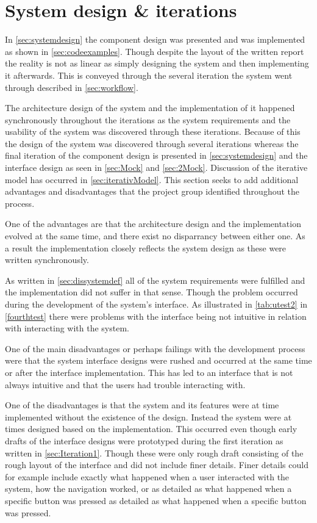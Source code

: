 \section{System design \& iterations}\label{sec:dissystemdes}

In \cref{sec:systemdesign} the component design was presented and was implemented as shown in \cref{sec:codeexamples}.
Though despite the layout of the written report the reality is not as linear as simply designing the system and then implementing it afterwards.
This is conveyed through the several iteration the system went through described in \cref{sec:workflow}.

The architecture design of the system and the implementation of it happened synchronously throughout the iterations as the system requirements and the usability of the system was discovered through these iterations.
Because of this the design of the system was discovered through several iterations whereas the final iteration of the component design is presented in \cref{sec:systemdesign} and the interface design as seen in \cref{sec:Mock} and \ref{sec:2Mock}.
Discussion of the iterative model has occurred in \cref{sec:iterativModel}.
This section seeks to add additional advantages and disadvantages that the project group identified throughout the process.

One of the advantages are that the architecture design and the implementation evolved at the same time, and there exist no disparrancy between either one.
As a result the implementation closely reflects the system design as these were written synchronously.

As written in \cref{sec:dissystemdef} all of the system requirements were fulfilled and the implementation did not suffer in that sense.
Though the problem occurred during the development of the system's interface.
As illustrated in \cref{tab:utest2} in \cref{fourthtest} there were problems with the interface being not intuitive in relation with interacting with the system. 

One of the main disadvantages or perhaps failings with the development process were that the system interface designs were rushed and occurred at the same time or after the interface implementation.
This has led to an interface that is not always intuitive and that the users had trouble interacting with.

One of the disadvantages is that the system and its features were at time implemented without the existence of the design.
Instead the system were at times designed based on the implementation.
This occurred even though early drafts of the interface designs were prototyped during the first iteration as written in \cref{sec:Iteration1}.
Though these were only rough draft consisting of the rough layout of the interface and did not include finer details.
Finer details could for example include exactly what happened when a user interacted with the system, how the navigation worked, or as detailed as what happened when a specific button was pressed as detailed as what happened when a specific button was pressed.

